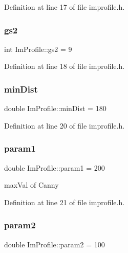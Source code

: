Definition at line 17 of file improfile.\+h.

\mbox{\label{struct_im_profile_a10bffd53b4e9115dbf0fae545a426bad}} 
\subsubsection{\texorpdfstring{gs2}{gs2}}
{\footnotesize\ttfamily int Im\+Profile\+::gs2 = 9}



Definition at line 18 of file improfile.\+h.

\mbox{\label{struct_im_profile_af5e44df036b18552062e4f9d9f926310}} 
\subsubsection{\texorpdfstring{min\+Dist}{minDist}}
{\footnotesize\ttfamily double Im\+Profile\+::min\+Dist = 180}



Definition at line 20 of file improfile.\+h.

\mbox{\label{struct_im_profile_a921b476664441309c914b58331ead364}} 
\subsubsection{\texorpdfstring{param1}{param1}}
{\footnotesize\ttfamily double Im\+Profile\+::param1 = 200}



max\+Val of Canny 



Definition at line 21 of file improfile.\+h.

\mbox{\label{struct_im_profile_ac84186e94a1900eaf9f2a6e1a7ab3014}} 
\subsubsection{\texorpdfstring{param2}{param2}}
{\footnotesize\ttfamily double Im\+Profile\+::param2 = 100}



